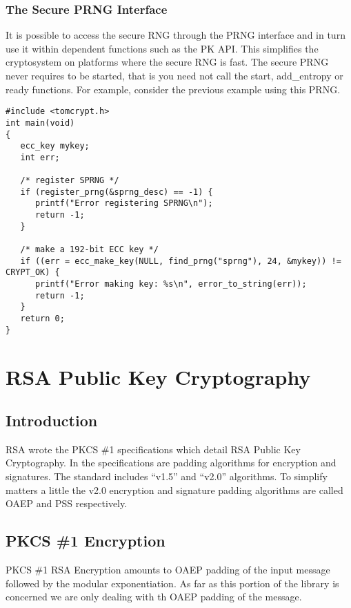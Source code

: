 \documentclass[a4paper]{book}
\begin{document}
\subsection{The Secure PRNG Interface}
It is possible to access the secure RNG through the PRNG interface and in turn use it within dependent functions such
as the PK API.  This simplifies the cryptosystem on platforms where the secure RNG is fast.  The secure PRNG never 
requires to be started, that is you need not call the start, add\_entropy or ready functions.  For example, consider
the previous example using this PRNG.

\begin{small}
\begin{verbatim}
#include <tomcrypt.h>
int main(void)
{
   ecc_key mykey;
   int err;

   /* register SPRNG */
   if (register_prng(&sprng_desc) == -1) {
      printf("Error registering SPRNG\n");
      return -1;
   }

   /* make a 192-bit ECC key */
   if ((err = ecc_make_key(NULL, find_prng("sprng"), 24, &mykey)) != CRYPT_OK) {
      printf("Error making key: %s\n", error_to_string(err));
      return -1;
   }
   return 0;
}
\end{verbatim}
\end{small}



\chapter{RSA Public Key Cryptography}

\section{Introduction}
RSA wrote the PKCS \#1 specifications which detail RSA Public Key Cryptography.  In the specifications are
padding algorithms for encryption and signatures.  The standard includes ``v1.5'' and ``v2.0'' algorithms.
To simplify matters a little the v2.0 encryption and signature padding algorithms are called OAEP and PSS 
respectively.  

\section{PKCS \#1 Encryption}

PKCS \#1 RSA Encryption amounts to OAEP padding of the input message followed by the modular exponentiation.  As far as this portion of
the library is concerned we are only dealing with th OAEP padding of the message.
\end{document}
